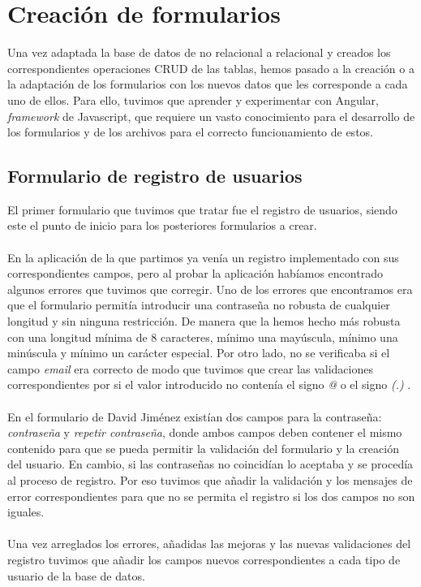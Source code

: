 \documentclass[11pt]{book}
\begin{document}
 \chapter{Creación de formularios}\label{cap:formularios}
 Una vez adaptada la base de datos de no relacional a relacional y creados los correspondientes operaciones CRUD de las tablas, hemos pasado a la creación o a la adaptación de los formularios con los nuevos datos que les corresponde a cada uno de ellos. Para ello, tuvimos que aprender y experimentar con Angular, \emph{framework} de Javascript, que requiere un vasto conocimiento para el desarrollo de los formularios y de los archivos para el correcto funcionamiento de estos.
 \section{Formulario de registro de usuarios}
 El primer formulario que tuvimos que tratar fue el registro de usuarios, siendo este el punto de inicio para los posteriores formularios a crear.\\\\
 En la aplicación de la que partimos ya venía un registro implementado con sus correspondientes campos, pero al probar la aplicación habíamos encontrado algunos errores que tuvimos que corregir. Uno de los errores que encontramos era que el formulario permitía introducir una contraseña no robusta de cualquier longitud y sin ninguna restricción. De manera que la hemos hecho más robusta con una longitud mínima de 8 caracteres, mínimo una mayúscula, mínimo una minúscula y mínimo un carácter especial. Por otro lado, no se verificaba si el campo \emph{email} era correcto de modo que tuvimos que crear las validaciones correspondientes por si el valor introducido no contenía el signo \emph{@} o el signo \emph{(.)} .\\\\
 En el formulario de David Jiménez existían dos campos para la contraseña: \emph{contraseña} y   \emph{repetir contraseña}, donde ambos campos deben contener el mismo contenido para que se pueda permitir la validación del formulario y la creación del usuario. En cambio, si las contraseñas no coincidían lo aceptaba y se procedía al proceso de registro. Por eso tuvimos que añadir la validación y los mensajes de error correspondientes para que no se permita el registro si los dos campos no son iguales.\\\\
 Una vez arreglados los errores, añadidas las mejoras y las nuevas validaciones del registro tuvimos que añadir los campos nuevos correspondientes a cada tipo de usuario de la base de datos. \\\\
\end{document}

